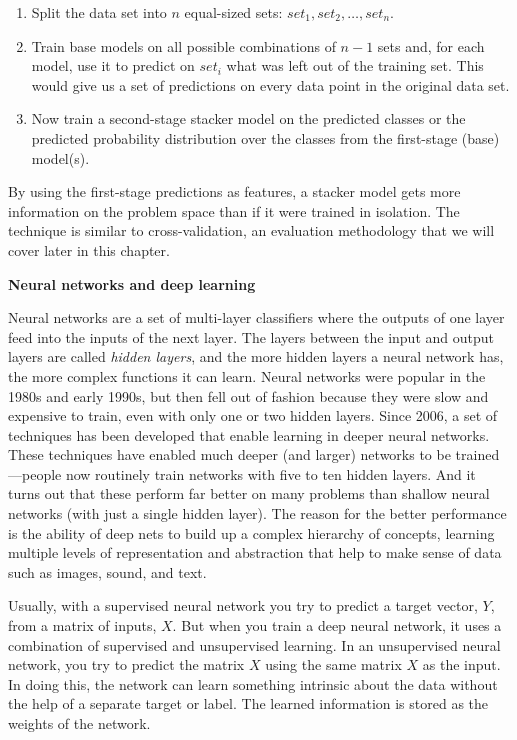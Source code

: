 \documentclass[]{krantz}
\begin{document}
\begin{enumerate}
\def\labelenumi{\arabic{enumi}.}
\item
  Split the data set into \(n\) equal-sized sets:
  \(set_1, set_2,\ldots,set_n\).
\item
  Train base models on all possible combinations of \(n-1\) sets and,
  for each model, use it to predict on \(set_i\) what was left out of
  the training set. This would give us a set of predictions on every
  data point in the original data set.
\item
  Now train a second-stage stacker model on the predicted classes or the
  predicted probability distribution over the classes from the
  first-stage (base) model(s).
\end{enumerate}

By using the first-stage predictions as features, a stacker model gets
more information on the problem space than if it were trained in
isolation. The technique is similar to cross-validation, an evaluation
methodology that we will cover later in this chapter.

\textbf{Neural networks and deep learning}

Neural networks are a set of multi-layer classifiers where the outputs
of one layer feed into the inputs of the next layer. The layers between
the input and output layers are called \emph{hidden layers}, and the
more hidden layers a neural network has, the more complex functions it
can learn. Neural networks were popular in the 1980s and early 1990s,
but then fell out of fashion because they were slow and expensive to
train, even with only one or two hidden layers. Since 2006, a set of
techniques has been developed that enable learning in deeper neural
networks. These techniques have enabled much deeper (and larger)
networks to be trained---people now routinely train networks with five
to ten hidden layers. And it turns out that these perform far better on
many problems than shallow neural networks (with just a single hidden
layer). The reason for the better performance is the ability of deep
nets to build up a complex hierarchy of concepts, learning multiple
levels of representation and abstraction that help to make sense of data
such as images, sound, and text.

Usually, with a supervised neural network you try to predict a target
vector, \(Y\), from a matrix of inputs, \(X\). But when you train a deep
neural network, it uses a combination of supervised and unsupervised
learning. In an unsupervised neural network, you try to predict the
matrix \(X\) using the same matrix \(X\) as the input. In doing this,
the network can learn something intrinsic about the data without the
help of a separate target or label. The learned information is stored as
the weights of the network.
\end{document}
